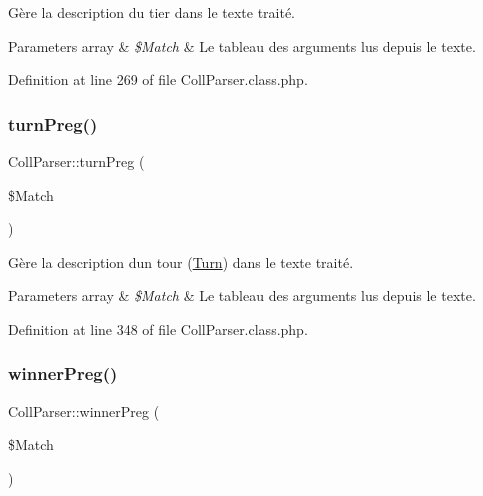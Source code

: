 Gère la description du tier dans le texte traité.


\begin{DoxyParams}[1]{Parameters}
array & {\em \$\+Match} & Le tableau des arguments lus depuis le texte. \\
\hline
\end{DoxyParams}


Definition at line 269 of file Coll\+Parser.\+class.\+php.

\mbox{\label{class_coll_parser_a2f101c518748f0b3bc9705931b093f51}} 
\subsubsection{\texorpdfstring{turn\+Preg()}{turnPreg()}}
{\footnotesize\ttfamily Coll\+Parser\+::turn\+Preg (\begin{DoxyParamCaption}\item[{}]{\$\+Match }\end{DoxyParamCaption})\hspace{0.3cm}{\ttfamily [protected]}}

Gère la description d\textquotesingle{}un tour (\hyperlink{class_turn}{Turn}) dans le texte traité.


\begin{DoxyParams}[1]{Parameters}
array & {\em \$\+Match} & Le tableau des arguments lus depuis le texte. \\
\hline
\end{DoxyParams}


Definition at line 348 of file Coll\+Parser.\+class.\+php.

\mbox{\label{class_coll_parser_a69653970e854541c1627eb25fa271d32}} 
\subsubsection{\texorpdfstring{winner\+Preg()}{winnerPreg()}}
{\footnotesize\ttfamily Coll\+Parser\+::winner\+Preg (\begin{DoxyParamCaption}\item[{}]{\$\+Match }\end{DoxyParamCaption})\hspace{0.3cm}{\ttfamily [protected]}}

